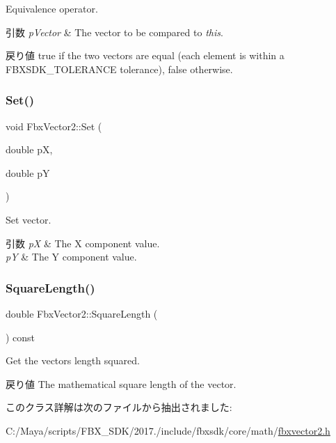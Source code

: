 Equivalence operator. 
\begin{DoxyParams}{引数}
{\em p\+Vector} & The vector to be compared to {\itshape this}. \\
\hline
\end{DoxyParams}
\begin{DoxyReturn}{戻り値}
{\ttfamily true} if the two vectors are equal (each element is within a F\+B\+X\+S\+D\+K\+\_\+\+T\+O\+L\+E\+R\+A\+N\+CE tolerance), {\ttfamily false} otherwise. 
\end{DoxyReturn}
\mbox{\label{class_fbx_vector2_a3a28093a354342dcf424cab26f732a57}} 
\subsubsection{\texorpdfstring{Set()}{Set()}}
{\footnotesize\ttfamily void Fbx\+Vector2\+::\+Set (\begin{DoxyParamCaption}\item[{double}]{pX,  }\item[{double}]{pY }\end{DoxyParamCaption})}

Set vector. 
\begin{DoxyParams}{引数}
{\em pX} & The X component value. \\
\hline
{\em pY} & The Y component value. \\
\hline
\end{DoxyParams}
\mbox{\label{class_fbx_vector2_ab0ca231fe7ccb6eb044c9e48f105cbcf}} 
\subsubsection{\texorpdfstring{Square\+Length()}{SquareLength()}}
{\footnotesize\ttfamily double Fbx\+Vector2\+::\+Square\+Length (\begin{DoxyParamCaption}{ }\end{DoxyParamCaption}) const}

Get the vector\textquotesingle{}s length squared. \begin{DoxyReturn}{戻り値}
The mathematical square length of the vector. 
\end{DoxyReturn}


このクラス詳解は次のファイルから抽出されました\+:\begin{DoxyCompactItemize}
\item 
C\+:/\+Maya/scripts/\+F\+B\+X\+\_\+\+S\+D\+K/2017./include/fbxsdk/core/math/\hyperlink{fbxvector2_8h}{fbxvector2.\+h}\end{DoxyCompactItemize}
